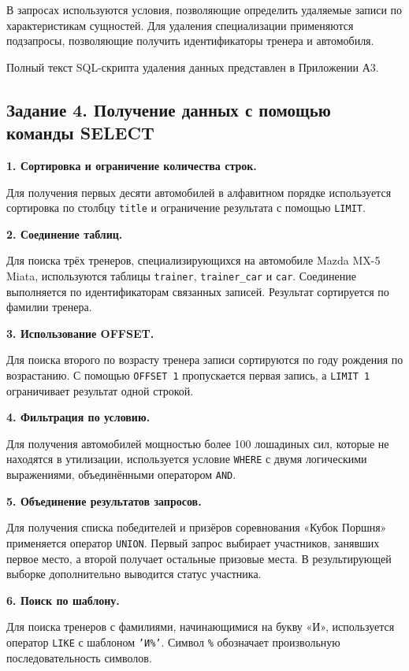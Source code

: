 \documentclass[oneside,a4paper,14pt]{extarticle}
\begin{document}
В запросах используются условия, позволяющие определить удаляемые записи по характеристикам сущностей. Для удаления специализации применяются подзапросы, позволяющие получить идентификаторы тренера и автомобиля.

Полный текст SQL-скрипта удаления данных представлен в Приложении А3.

\subsection{Задание 4. Получение данных с помощью команды SELECT}

\textbf{1. Сортировка и ограничение количества строк.}

Для получения первых десяти автомобилей в алфавитном порядке используется сортировка по столбцу \texttt{title} и ограничение результата с помощью \texttt{LIMIT}.

\textbf{2. Соединение таблиц.}

Для поиска трёх тренеров, специализирующихся на автомобиле Mazda MX-5 Miata, используются таблицы \texttt{trainer}, \texttt{trainer\_car} и \texttt{car}. Соединение выполняется по идентификаторам связанных записей. Результат сортируется по фамилии тренера.

\textbf{3. Использование OFFSET.}

Для поиска второго по возрасту тренера записи сортируются по году рождения по возрастанию. С помощью \texttt{OFFSET 1} пропускается первая запись, а \texttt{LIMIT 1} ограничивает результат одной строкой.

\textbf{4. Фильтрация по условию.}

Для получения автомобилей мощностью более 100 лошадиных сил, которые не находятся в утилизации, используется условие \texttt{WHERE} с двумя логическими выражениями, объединёнными оператором \texttt{AND}.

\textbf{5. Объединение результатов запросов.}

Для получения списка победителей и призёров соревнования «Кубок Поршня» применяется оператор \texttt{UNION}. Первый запрос выбирает участников, занявших первое место, а второй получает остальные призовые места. В результирующей выборке дополнительно выводится статус участника.

\textbf{6. Поиск по шаблону.}

Для поиска тренеров с фамилиями, начинающимися на букву «И», используется оператор \texttt{LIKE} с шаблоном \texttt{'И\%'}. Символ \texttt{\%} обозначает произвольную последовательность символов.
\end{document}
